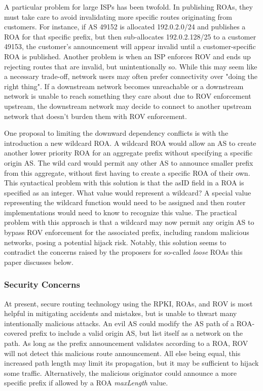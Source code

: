 \documentclass[sigconf]{acmart}
\begin{document}
A particular problem for large ISPs has been twofold.  In publishing
ROAs, they must take care to avoid invalidating more specific routes
originating from customers.  For instance, if AS 49152 is allocated
192.0.2.0/24 and publishes a ROA for that specific prefix, but then
sub-allocates 192.0.2.128/25 to a customer 49153, the customer's
announcement will appear invalid until a customer-specific ROA is
published.  Another problem is when an ISP enforces ROV and ends up
rejecting routes that are invalid, but unintentionally so.  While this
may seem like a necessary trade-off, network users may often prefer
connectivity over "doing the right thing".  If a downstream network
becomes unreachable or a downstream network is unable to reach something
they care about due to ROV enforcement upstream, the downstream network
may decide to connect to another upstream network that doesn't burden
them with ROV enforcement.

One proposal to limiting the downward dependency conflicts is with the
introduction a new wildcard ROA.\cite{gilad_are_2017}  A wildcard ROA
would allow an AS to create another lower priority ROA for an aggregate
prefix without specifying a specific origin AS.  The wild card would
permit any other AS to announce smaller prefix from this aggregate,
without first having to create a specific ROA of their own.  This
syntactical problem with this solution is that the asID field in a ROA
is specified as an integer.  What value would represent a wildcard?  A
special value representing the wildcard function would need to be
assigned and then router implementations would need to know to recognize
this value.  The practical problem with this approach is that a wildcard
may now permit any origin AS to bypass ROV enforcement for the
associated prefix, including random malicious networks, posing a
potential hijack risk.  Notably, this solution seems to contradict the
concerns raised by the proposers for so-called \emph{loose} ROAs
this paper discusses below.

\subsubsection{Security Concerns}

At present, secure routing technology using the RPKI, ROAs, and ROV is
most helpful in mitigating accidents and mistakes, but is unable to
thwart many intentionally malicious attacks.  An evil AS could modify
the AS path of a ROA-covered prefix to include a valid origin AS, but
list itself as a network on the path.  As long as the prefix
announcement validates according to a ROA, ROV will not detect this
malicious route announcement.  All else being equal, this increased path
length may limit its propagation, but it may be sufficient to hijack
some traffic.  Alternatively, the malicious originator could announce a
more specific prefix if allowed by a ROA \emph{maxLength} value.
\end{document}
